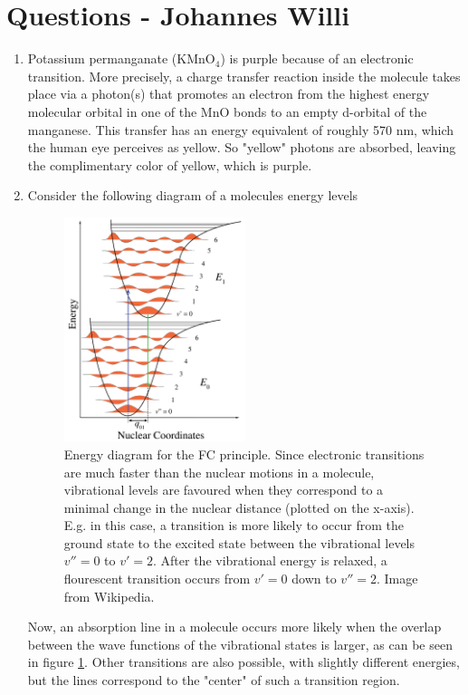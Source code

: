 \documentclass[a4paper,10pt]{article}
\begin{document}
\section{Questions - Johannes Willi}
\begin{enumerate}
\item Potassium permanganate (KMnO$_4$) is purple because of an electronic transition. More precisely, a charge 
transfer reaction inside the molecule takes place via a photon(s) that promotes an electron from the highest energy molecular orbital in one of the MnO bonds to an empty d-orbital of the manganese. This transfer has an energy equivalent 
of roughly 570 nm, which the human eye perceives as yellow. So "yellow" photons are absorbed, leaving the complimentary color of yellow, which is purple.
\item Consider the following diagram of a molecules energy levels
\begin{figure}[H]
\centering
\includegraphics[width=0.5\textwidth]{fc.png}
\caption{Energy diagram for the FC principle. Since electronic transitions are much faster than the nuclear motions in a molecule, vibrational levels are favoured when they correspond to a minimal change in the nuclear distance (plotted on the x-axis). E.g. in this case, a transition is more likely to occur from the ground state to the excited state between the vibrational levels $v''=0$ to $v'=2$. After the vibrational energy is relaxed, a flourescent transition occurs from $v'=0$ down to $v''=2$. Image from Wikipedia.}
\label{fig:fc}
\end{figure}
Now, an absorption line in a molecule occurs more likely when the overlap between the wave functions of the vibrational states is larger, as can be seen in figure \ref{fig:fc}. Other transitions are also possible, with slightly different energies, but the lines correspond to the "center" of such a transition region.

\end{enumerate}
\end{document}
